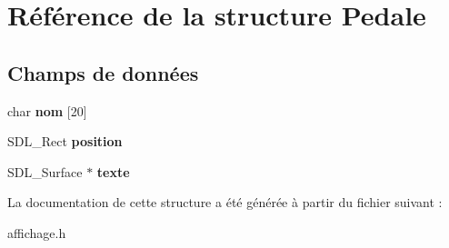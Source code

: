 \hypertarget{structPedale}{}\section{Référence de la structure Pedale}
\label{structPedale}
\subsection*{Champs de données}
\begin{DoxyCompactItemize}
\item 
char {\bfseries nom} \mbox{[}20\mbox{]}\hypertarget{structPedale_aadad624255828e83c18a11df31c8f559}{}\label{structPedale_aadad624255828e83c18a11df31c8f559}

\item 
S\+D\+L\+\_\+\+Rect {\bfseries position}\hypertarget{structPedale_ac06cf6a292dc0e70e28b394fa481aef2}{}\label{structPedale_ac06cf6a292dc0e70e28b394fa481aef2}

\item 
S\+D\+L\+\_\+\+Surface $\ast$ {\bfseries texte}\hypertarget{structPedale_a5b66158197948c551bbf808da9f95726}{}\label{structPedale_a5b66158197948c551bbf808da9f95726}

\end{DoxyCompactItemize}


La documentation de cette structure a été générée à partir du fichier suivant \+:\begin{DoxyCompactItemize}
\item 
affichage.\+h\end{DoxyCompactItemize}
